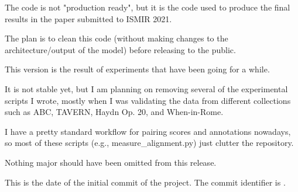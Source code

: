 The code is not "production ready", but it is the code used
to produce the final results in the paper submitted to ISMIR
2021.

The plan is to clean this code (without making changes to
the architecture/output of the model) before releasing to
the public.

This version is the result of experiments that have been
going for a while.

It is not stable yet, but I am planning on removing several
of the experimental scripts I wrote, mostly when I was
validating the data from different collections such as ABC,
TAVERN, Haydn Op. 20, and When-in-Rome.

I have a pretty standard workflow for pairing scores and
annotations nowadays, so most of these scripts (e.g.,
measure\_alignment.py) just clutter the repository.

Nothing major should have been omitted from this release.


This is the date of the initial commit of the project. The
commit identifier is .
